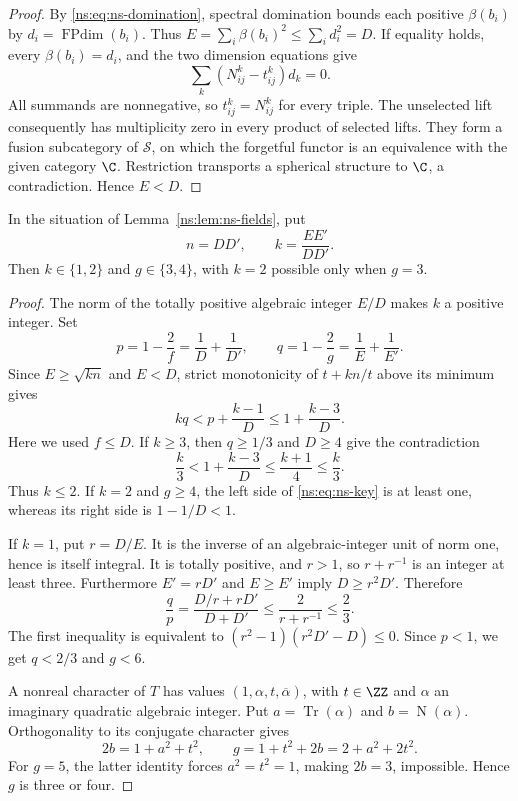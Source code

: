 \begin{proof}
By \eqref{ns:eq:ns-domination}, spectral domination bounds each positive
$\beta(b_i)$ by $d_i=\operatorname{FPdim}(b_i)$. Thus
$E=\sum_i\beta(b_i)^2\leq\sum_i d_i^2=D$. If equality holds, every
$\beta(b_i)=d_i$, and the two dimension equations give
\[
 \sum_k (N_{ij}^k-t_{ij}^k)d_k=0.
\]
All summands are nonnegative, so $t_{ij}^k=N_{ij}^k$ for every triple.
The unselected lift consequently has multiplicity zero in every
product of selected lifts. They form a fusion subcategory of
$\mathcal S$, on which the forgetful functor is an equivalence with
the given category $\C$. Restriction transports a spherical
structure to $\C$, a contradiction. Hence $E<D$.
\end{proof}

\begin{lemma}\label{ns:lem:ns-small-codegree}
In the situation of Lemma~\ref{ns:lem:ns-fields}, put
\[
 n=DD',\qquad k=\frac{EE'}{DD'}.
\]
Then $k\in\{1,2\}$ and $g\in\{3,4\}$, with $k=2$ possible only
when $g=3$.
\end{lemma}

\begin{proof}
The norm of the totally positive algebraic integer $E/D$ makes $k$
a positive integer. Set
\[
 p=1-\frac2f=\frac1D+\frac1{D'},\qquad
 q=1-\frac2g=\frac1E+\frac1{E'}.
\]
Since $E\geq\sqrt{kn}$ and $E<D$, strict monotonicity of
$t+kn/t$ above its minimum gives
\begin{equation}\label{ns:eq:ns-key}
 kq<p+\frac{k-1}{D}\leq1+\frac{k-3}{D}.
\end{equation}
Here we used $f\leq D$. If $k\geq3$, then $q\geq1/3$ and $D\geq4$
give the contradiction
\[
 \frac{k}{3}<1+\frac{k-3}{D}\leq\frac{k+1}{4}\leq\frac{k}{3}.
\]
Thus $k\leq2$. If $k=2$ and $g\geq4$, the left side of
\eqref{ns:eq:ns-key} is at least one, whereas its right side is
$1-1/D<1$.

If $k=1$, put $r=D/E$. It is the inverse of an algebraic-integer
unit of norm one, hence is itself integral. It is totally positive,
and $r>1$, so $r+r^{-1}$ is an integer at least three.
Furthermore $E'=rD'$ and $E\geq E'$ imply $D\geq r^2D'$. Therefore
\[
 \frac qp=\frac{D/r+rD'}{D+D'}
 \leq\frac2{r+r^{-1}}\leq\frac23.
\]
The first inequality is equivalent to
$(r^2-1)(r^2D'-D)\leq0$. Since $p<1$, we get $q<2/3$ and $g<6$.

A nonreal character of $T$ has values
$(1,\alpha,t,\overline\alpha)$, with $t\in\ZZ$ and
$\alpha$ an imaginary quadratic algebraic integer. Put
$a=\operatorname{Tr}(\alpha)$ and $b=\operatorname{N}(\alpha)$.
Orthogonality to its conjugate character gives
\begin{equation}\label{ns:eq:ns-nonreal}
 2b=1+a^2+t^2,\qquad g=1+t^2+2b=2+a^2+2t^2.
\end{equation}
For $g=5$, the latter identity forces $a^2=t^2=1$, making $2b=3$,
impossible. Hence $g$ is three or four.
\end{proof}

